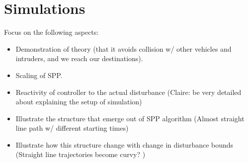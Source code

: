 \section{Simulations}

Focus on the following aspects:
\begin{itemize}
\item Demonstration of theory (that it avoids collision w/ other vehicles and intruders, and we reach our destinations).
\item Scaling of SPP.
\item Reactivity of controller to the actual disturbance (Claire: be very detailed about explaining the setup of simulation)
\item Illustrate the structure that emerge out of SPP algorithm (Almost straight line path w/ different starting times)
\item Illustrate how this structure change with change in disturbance bounds (Straight line trajectories become curvy? )
\end{itemize}


